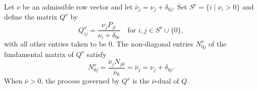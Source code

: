 Let $\nu$ be an admissible row vector and let $\bar{\nu}_j = \nu_j + \delta_{0j}$. Set $S^\nu = \{i \mid \nu_i > 0\}$ and define the matrix $Q^\nu$ by
$$Q_{ij}^\nu = \frac{\nu_j P_{ji}}{\nu_i + \delta_{0i}} \quad \text{for } i, j \in S^\nu \cup \{0\},$$
with all other entries taken to be $0$. The non-diagonal entries $N_{0j}^\nu$ of the fundamental matrix of $Q^\nu$ satisfy
$$N_{0j}^\nu = \frac{\bar{\nu}_j N_{j0}}{\bar{\nu}_0} = \bar{\nu}_j = \nu_j + \delta_{0j}.$$
When $\bar{\nu} > 0$, the process governed by $Q^\nu$ is the $\bar{\nu}$-dual of $Q$.
